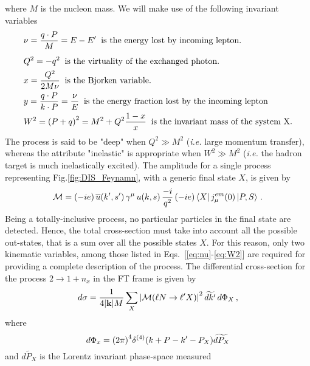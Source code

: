 where $M$ is the nucleon mass. We will make use of the following invariant variables
\begin{align}
        & \nu = \frac{q \cdot P}{M} = E - E' \;\; \textrm{is the energy lost by incoming lepton.}
        \label{eq:nu}\\[5pt]
        & Q^2 = - q^2 \;\; \textrm{is the virtuality of the exchanged photon.}
        \label{eq:Q2}\\
        & x=\frac{Q^2}{2M\nu} \;\; \textrm{is the Bjorken variable.}
        \label{eq:x}\\
        & y = \frac{q\cdot P}{k \cdot P} = \frac{\nu}{E} \; \; \textrm{is the energy fraction lost by the incoming lepton}
        \label{eq:y}\\
        & W^2 = \qty(P + q)^2 = M^2 + Q^2 \frac{1-x}{x} \;\; \textrm{is the invariant mass of the system X.}
        \label{eq:W2}
\end{align}
The process  is said to be "deep" when $Q^2 \gg M^2$ (\textit{i.e.} large momentum transfer), whereas the attribute "inelastic" is appropriate when $W^2 \gg M^2$ (\textit{i.e.} the hadron target is much inelastically excited). The amplitude for a single process representing Fig.\ref{fig:DIS_Feynamn}, with a generic final state $X$, is given by
\begin{equation}
    \mathcal{M} = (-i e) \, \overline{u}(k',s') \, \gamma^{\mu}\, u(k,s) \, \frac{-i}{q^2} \, (-i e)\bra{X} j_{\mu}^{em} \qty(0) \ket{P,S} \,.
    \label{eq:ch2:amplitude}
\end{equation}
Being a totally-inclusive process, no particular particles in the final state are detected. Hence, the total cross-section must take into account all the possible out-states, that is a sum over all the possible states $X$. For this reason, only two kinematic variables, among those listed in Eqs.~[\ref{eq:nu}-\ref{eq:W2}] are required for providing a complete description of the process. The differential cross-section for the process $2 \rightarrow 1 + n_x$ in the FT frame is given by 
\begin{equation}
    d\sigma = \frac{1}{4 \qty|\vb{k}| M} \sum_{X} \qty| \mathcal{M} \qty( \ell N \rightarrow \ell'X ) |^2 \, \widetilde{d k'} \,  d\Phi_X \, ,
    \label{eq:ch2:dsigma}
\end{equation}
where
\begin{equation}
        d \Phi_x = \qty(2\pi)^4 \delta^{(4)} \qty( k + P - k' - P_X ) \widetilde{dP_X}  
\end{equation}
and $\widetilde{dP_X}$ is the Lorentz invariant phase-space measured
